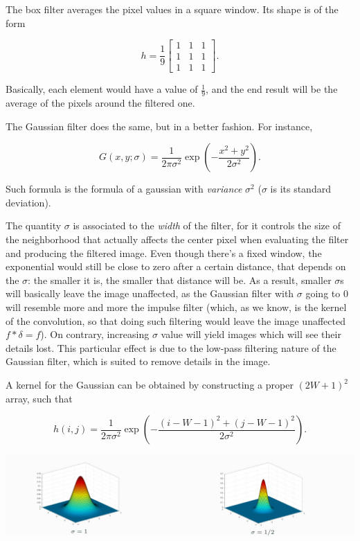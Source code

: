 \documentclass[10pt]{report}
\begin{document}
The box filter averages the pixel values in a square window. Its shape
is of the form

\[ h = \frac{1}{9} \begin{bmatrix} 1 & 1 & 1 \\ 1 & 1 & 1 \\ 1 & 1 & 1 \end{bmatrix}. \]

Basically, each element would have a value of \(\frac{1}{9}\), and the
end result will be the average of the pixels around the filtered one.

The Gaussian filter does the same, but in a better fashion. For
instance,

\[ G(x, y; \sigma) = \frac{1}{2 \pi \sigma^2} \exp{\left(-\frac{x^2 + y^2}{2\sigma^2}\right)}.\]

Such formula is the formula of a gaussian with \emph{variance} \(\sigma^2\)
(\(\sigma\) is its standard deviation).

The quantity \(\sigma\) is associated to the \emph{width} of the filter, for
it controls the size of the neighborhood that actually affects the
center pixel when evaluating the filter and producing the filtered
image. Even though there's a fixed window, the exponential would still
be close to zero after a certain distance, that depends on the
\(\sigma\): the smaller it is, the smaller that distance will be. As a
result, smaller \(\sigma\)s will basically leave the image unaffected,
as the Gaussian filter with \(\sigma\) going to \(0\) will resemble more
and more the impulse filter (which, as we know, is the kernel of the
convolution, so that doing such filtering would leave the image
unaffected \(f * \delta = f\)). On contrary, increasing \(\sigma\) value
will yield images which will see their details lost. This particular
effect is due to the low-pass filtering nature of the Gaussian filter,
which is suited to remove details in the image.

A kernel for the Gaussian can be obtained by constructing a proper
\((2W + 1)^2\) array, such that

\[h(i,j) = \frac{1}{2\pi \sigma^2} \exp{\left(-\frac{(i - W - 1)^2 + (j - W - 1)^2}{2\sigma^2}\right)}.\]

\begin{center}
\includegraphics[width=.9\linewidth]{./pics/proc/gaussian-sigma.jpg}
\end{center}
\end{document}

